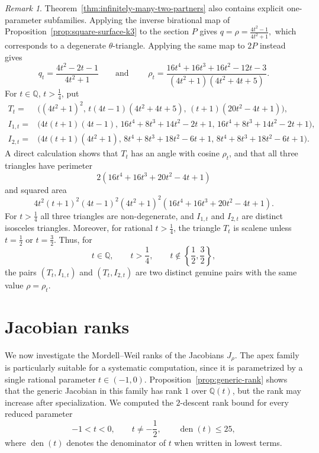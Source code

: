 \documentclass[11pt]{amsart}
\theoremstyle{plain}
\theoremstyle{remark}
\newtheorem{rem}[thm]{Remark}
\theoremstyle{plain}
\newcommand{\Q}{\mathbb{Q}}
\begin{document}
\begin{rem}
Theorem~\ref{thm:infinitely-many-two-partners} also contains explicit
one-parameter subfamilies.
Applying the inverse birational map of Proposition~\ref{prop:square-surface-k3} to the section $P$ gives $q=\rho=\frac{4t^2-1}{4t^2+1},$
which corresponds to a degenerate $\theta$-triangle. Applying the same
map to $2P$ instead gives
\[
q_t=\frac{4t^2-2t-1}{4t^2+1}
\qquad \mbox{
and }\qquad
\rho_t=
\frac{16t^4+16t^3+16t^2-12t-3}
     {(4t^2+1)(4t^2+4t+5)}.
\]
For $t\in\Q$, $t>\frac14$, put
\[
\begin{aligned}
T_t={}&\bigl(
(4t^2+1)^2,\,
t(4t-1)(4t^2+4t+5),\,
(t+1)(20t^2-4t+1)
\bigr),\\
I_{1,t}={}&\bigl(
4t(t+1)(4t-1),\,
16t^4+8t^3+14t^2-2t+1,\,
16t^4+8t^3+14t^2-2t+1
\bigr),\\
I_{2,t}={}&\bigl(
4t(t+1)(4t^2+1),\,
8t^4+8t^3+18t^2-6t+1,\,
8t^4+8t^3+18t^2-6t+1
\bigr).
\end{aligned}
\]
A direct calculation shows that $T_t$ has an angle with cosine
$\rho_t$, and that all three triangles have perimeter
\[
2(16t^4+16t^3+20t^2-4t+1)
\]
and squared area
\[
4t^2(t+1)^2(4t-1)^2(4t^2+1)^2
(16t^4+16t^3+20t^2-4t+1).
\]
For $t>\frac14$ all three triangles are non-degenerate, and
$I_{1,t}$ and $I_{2,t}$ are distinct isosceles triangles. Moreover,
for rational $t>\frac14$, the triangle $T_t$ is scalene unless
$t=\frac12$ or $t=\frac32$. Thus, for
\[
t\in\Q,\qquad t>\frac14,\qquad
t\notin\left\{\frac12,\frac32\right\},
\]
the pairs $(T_t,I_{1,t})$ and $(T_t,I_{2,t})$ are two distinct genuine
pairs with the same value $\rho=\rho_t$.
\end{rem}



\section{Jacobian ranks}
\label{sec:jacobian-ranks}

We now investigate the Mordell--Weil ranks of the Jacobians
$J_\rho$. The apex family is particularly suitable for a systematic
computation, since it is parametrized by a single rational parameter
$t\in(-1,0)$. Proposition~\ref{prop:generic-rank} shows that the
generic Jacobian in this family has rank $1$ over $\Q(t)$, but the rank
may increase after specialization. We computed the
$2$-descent rank bound for every reduced parameter
\begin{equation} \label{eq:198}
-1<t<0,\qquad t\ne-\frac12,\qquad
\operatorname{den}(t)\leq25,
\end{equation}
where $\operatorname{den}(t)$ denotes the denominator of $t$ when written in lowest terms.
\end{document}
